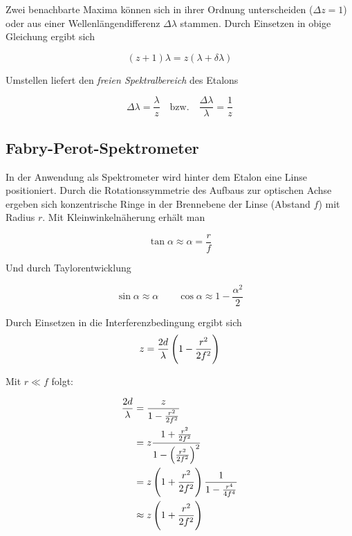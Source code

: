 \documentclass[a4paper,german,12pt,smallheadings]{scrartcl}
\begin{document}
Zwei benachbarte Maxima können sich in ihrer Ordnung unterscheiden ($\Delta z =
1$) oder aus einer Wellenlängendifferenz $\Delta \lambda$ stammen. Durch
Einsetzen in obige Gleichung ergibt sich

\begin{equation}
  (z+1) \lambda = z (\lambda + \delta \lambda)
\end{equation}

Umstellen liefert den \textit{freien Spektralbereich} des Etalons

\begin{equation}
  \Delta \lambda = \frac{\lambda}{z} \quad \text{bzw.} \quad \frac{\Delta \lambda}{\lambda} = \frac{1}{z}
\end{equation}

\subsection{Fabry-Perot-Spektrometer}

In der Anwendung als Spektrometer wird hinter dem Etalon eine Linse
positioniert. Durch die Rotationssymmetrie des Aufbaus zur optischen Achse
ergeben sich konzentrische Ringe in der Brennebene der Linse (Abstand $f$) mit
Radius $r$. Mit Kleinwinkelnäherung erhält man

\begin{equation}
  \tan \alpha \approx \alpha = \frac{r}{f}
\end{equation}

Und durch Taylorentwicklung

\begin{equation}
  \sin \alpha \approx \alpha \qquad \cos \alpha \approx 1 - \frac{\alpha^2}{2}
\end{equation}

Durch Einsetzen in die Interferenzbedingung ergibt sich
\begin{equation}
  z = \frac{2d}{\lambda} \del{1 - \frac{r^2}{2f^2}}
  \label{eq:ord}
\end{equation}

Mit $r \ll f$ folgt:

\begin{align*}
  \frac{2d}{\lambda} &= \frac{z}{1-\frac{r^2}{2f^2}} \\
                     &= z \frac{1+\frac{r^2}{2f^2}}{1 - \del{\frac{r^2}{2f^2}}^2} \\
                     &= z \del{1 + \frac{r^2}{2f^2}} \frac{1}{1 - \frac{r^4}{4f^4}} \\
                     &\approx z \del{1+\frac{r^2}{2f^2}}
\end{align*}
\end{document}
